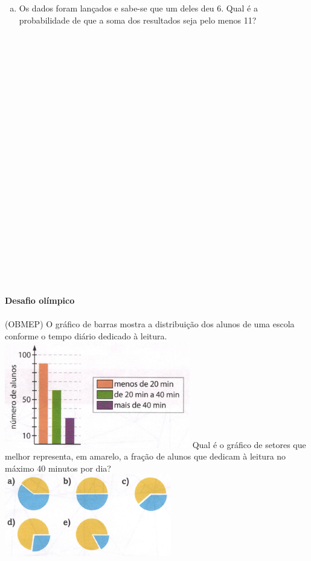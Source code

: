 \documentclass[a4paper,14pt]{article}
\begin{document}
\begin{multicols}{2}
\begin{enumerate}
\begin{enumerate}[a)]
				\item Os dados foram lançados e sabe-se que um deles deu 6. Qual é a probabilidade de que a soma dos resultados seja pelo menos 11? \\\\\\\\\\\\\\\\\\\\\\\\\\\\\\\\\\\\\\\\\\\\\\
		    \end{enumerate}
		    \textbf{Desafio olímpico} \\\\
		    (OBMEP) O gráfico de barras mostra a distribuição dos alunos de uma escola conforme o tempo diário dedicado à leitura. \\
		    \includegraphics[width=1\linewidth]{6FMA121_imagens/imagem1}
		    Qual é o gráfico de setores que melhor representa, em amarelo, a fração de alunos que dedicam à leitura no máximo 40 minutos por dia? \\
		    \includegraphics[width=1\linewidth]{6FMA121_imagens/imagem2} \newpage

\end{enumerate}
\end{multicols}
\end{document}
